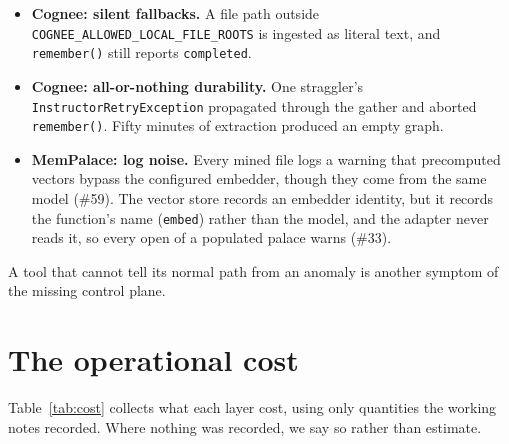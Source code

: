 \documentclass[11pt]{article}
\newcommand{\code}[1]{\texttt{#1}}
\begin{document}
\begin{itemize}
  \item \textbf{Cognee: silent fallbacks.} A file path outside
    \code{COGNEE\_ALLOWED\_\allowbreak LOCAL\_FILE\_ROOTS} is ingested as literal text, and \code{remember()}
    still reports \code{completed}.
  \item \textbf{Cognee: all-or-nothing durability.} One straggler's \code{InstructorRetryException}
    propagated through the gather and aborted \code{remember()}. Fifty minutes of extraction produced
    an empty graph.
  \item \textbf{MemPalace: log noise.} Every mined file logs a warning that precomputed vectors
    bypass the configured embedder, though they come from the same model (\#59). The vector store
    records an embedder identity, but it records the function's name (\code{embed}) rather than the
    model, and the adapter never reads it, so every open of a populated palace warns (\#33).
\end{itemize}
A tool that cannot tell its normal path from an anomaly is another symptom of the missing control
plane.

\section{The operational cost}
\label{sec:cost}

Table~\ref{tab:cost} collects what each layer cost, using only quantities the working notes
recorded. Where nothing was recorded, we say so rather than estimate.
\end{document}
